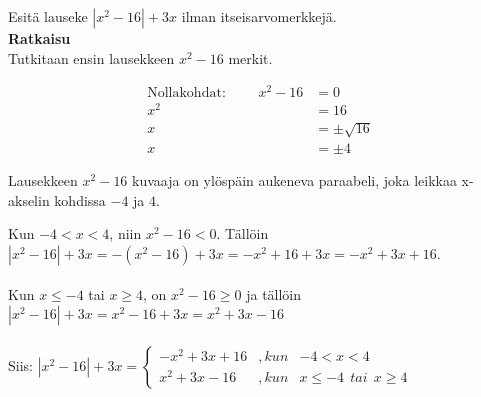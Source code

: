 \begin{esimerkki}
	Esitä lauseke $|x^2-16|+3x$ ilman itseisarvomerkkejä.\\
	\textbf{Ratkaisu} \\
	Tutkitaan ensin lausekkeen $x^2-16$ merkit.
	
	\begin{align*}
		\text{Nollakohdat: } \qquad	x^2-16 &=0 \\
			x^2 &=16 \\
			x &=\pm\sqrt{16} \\
			x &=\pm 4
	\end{align*}
	
	Lausekkeen $x^2-16$ kuvaaja on ylöspäin aukeneva paraabeli, joka leikkaa x-akselin kohdissa $-4$ ja $4$.
	
% 
%


\begin{lukusuora}{-10}{10}{8}
\end{lukusuora}

Kun $-4<x<4$, niin $x^2-16<0$. Tällöin \\
 $|x^2-16|+3x = -(x^2-16)+3x = -x^2+16+3x=-x^2+3x+16$. \\
 \\
 Kun $x\leq-4$ tai $x\geq4$, on $x^2-16\geq0$ ja tällöin\\
 $|x^2-16|+3x =x^2-16+3x=x^2+3x-16$ \\
 \\
 Siis:
			$|x^2-16|+3x= \left \{ \begin{array}{rcl}
			-x^2+3x+16 & , kun & -4<x<4 \\
			x^2+3x-16 & , kun & x\leq-4 \ \ tai \ \ x\geq4
			\end{array}\right.$

\end{esimerkki}
